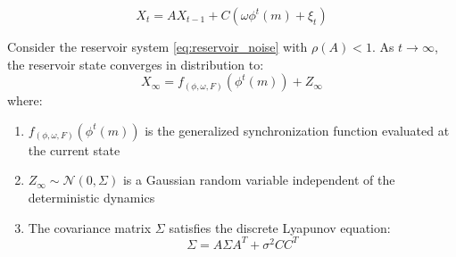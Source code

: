 \documentclass[10pt,a4paper]{amsart}
\begin{document}
\begin{equation}
X_t = AX_{t-1} + C(\omega\phi^t(m) + \xi_t)
\label{eq:reservoir_noise}
\end{equation}

\begin{theorem}
\label{thm:main}
Consider the reservoir system \eqref{eq:reservoir_noise} with $\rho(A) < 1$. As $t \to \infty$, the reservoir state converges in distribution to:
\begin{equation}
X_\infty = f_{(\phi,\omega,F)}(\phi^t(m)) + Z_\infty
\label{eq:decomposition}
\end{equation}
where:
\begin{enumerate}
    \item $f_{(\phi,\omega,F)}(\phi^t(m))$ is the generalized synchronization function evaluated at the current state
    \item $Z_\infty \sim \mathcal{N}(0, \Sigma)$ is a Gaussian random variable independent of the deterministic dynamics
    \item The covariance matrix $\Sigma$ satisfies the discrete Lyapunov equation:
    \begin{equation}
    \Sigma = A\Sigma A^T + \sigma^2 CC^T
    \label{eq:lyapunov}
    \end{equation}
\end{enumerate}
\end{theorem}
\end{document}
